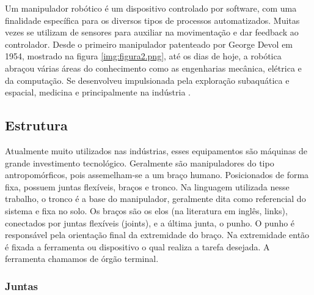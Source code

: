 Um manipulador robótico é um dispositivo controlado por software, com uma
finalidade específica para os diversos tipos de processos automatizados. Muitas vezes se utilizam de sensores para auxiliar na movimentação e dar feedback ao controlador. Desde o primeiro manipulador patenteado por George Devol em 1954, mostrado na figura \ref{img:figura2.png}, até os dias de hoje, a robótica abraçou várias áreas do conhecimento como as engenharias mecânica, elétrica e da computação. Se desenvolveu impulsionada pela exploração subaquática e espacial, medicina e principalmente na indústria \cite{Lopes2002}.


\subsection{Estrutura}

Atualmente muito utilizados nas indústrias, esses equipamentos são máquinas de grande investimento tecnológico. Geralmente são manipuladores do tipo antropomórficos, pois assemelham-se a um braço humano. Posicionados de forma fixa, possuem juntas flexíveis, braços e tronco. Na linguagem utilizada nesse trabalho, o tronco é a base do manipulador, geralmente dita como referencial do sistema e fixa no solo. Os braços são os elos (na literatura em inglês, links), conectados por juntas flexíveis (joints), e a última junta, o punho. O punho é responsável pela orientação final da extremidade do braço. Na extremidade então é fixada a ferramenta ou dispositivo o qual realiza a tarefa desejada. A ferramenta chamamos de órgão terminal. \cite{Spong2020}



\subsubsection{Juntas}

